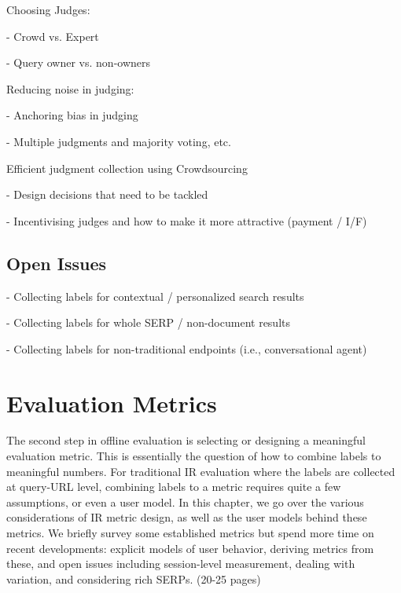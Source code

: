 \documentclass[openany]{now} %
\newcommand{\newpar}{\bigskip\noindent}
\begin{document}
Choosing Judges: 

- Crowd vs. Expert \cite{Kazai:2013} \cite{Alonso20121053}

- Query owner vs. non-owners \cite{Chouldechova:2013}

\newpar
Reducing noise in judging: 

- Anchoring bias in judging \cite{Shokouhi:2015}

- Multiple judgments and majority voting, etc. \cite{Venanzi:2014}

\cite{aroyo2013measuring} \cite{aroyo2013crowd}

\newpar
Efficient judgment collection using Crowdsourcing

- Design decisions that need to be tackled  \cite{Blanco:2011} \cite{Kazai2012} \cite{Alonso2012} \cite{Alonso:2015} \cite{Scholer:2013} 

- Incentivising judges and how to make it more attractive (payment / I/F)
\cite{Megorskaya2015} \cite{Davtyan2015}  \cite{Rokicki:2014}  \cite{Eickhoff:2012}

\section{Open Issues}

- Collecting labels for contextual / personalized search results

- Collecting labels for whole SERP / non-document results

- Collecting labels for non-traditional endpoints (i.e., conversational agent)

\chapter{Evaluation Metrics}
\label{c-metrics}

The second step in offline evaluation is selecting or designing a meaningful evaluation metric. This is essentially the question of how to combine labels to meaningful numbers. For traditional IR evaluation where the labels are collected at query-URL level, combining labels to a metric requires quite a few assumptions, or even a user model. In this chapter, we go over the various considerations of IR metric design, as well as the user models behind these metrics. We briefly survey some established metrics but spend more time on recent developments: explicit models of user behavior, deriving metrics from these, and open issues including session-level measurement, dealing with variation, and considering rich SERPs. (20-25 pages)
\end{document}
